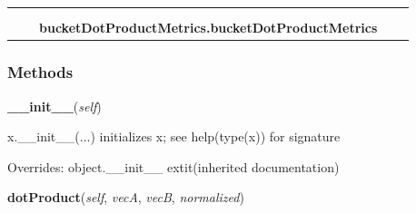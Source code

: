     \label{bucketDotProductMetrics:bucketDotProductMetrics}
\begin{tabular}{cccccc}
\multicolumn{2}{r}{\settowidth{\BCL}{object}\multirow{2}{\BCL}{object}}
&&
  \\\cline{3-3}
  &&\multicolumn{1}{c|}{}
&&
  \\
&&\multicolumn{2}{l}{\textbf{bucketDotProductMetrics.bucketDotProductMetrics}}
\end{tabular}



  \subsubsection{Methods}

    \vspace{0.5ex}

\hspace{.8\funcindent}\begin{boxedminipage}{\funcwidth}

    \raggedright \textbf{\_\_init\_\_}(\textit{self})

\setlength{\parskip}{2ex}
    x.\_\_init\_\_(...) initializes x; see help(type(x)) for signature

\setlength{\parskip}{1ex}
      Overrides: object.\_\_init\_\_ 	extit{(inherited documentation)}

    \end{boxedminipage}

    \label{bucketDotProductMetrics:bucketDotProductMetrics:dotProduct}

    \vspace{0.5ex}

\hspace{.8\funcindent}\begin{boxedminipage}{\funcwidth}

    \raggedright \textbf{dotProduct}(\textit{self}, \textit{vecA}, \textit{vecB}, \textit{normalized})

\setlength{\parskip}{2ex}
\setlength{\parskip}{1ex}
    \end{boxedminipage}

